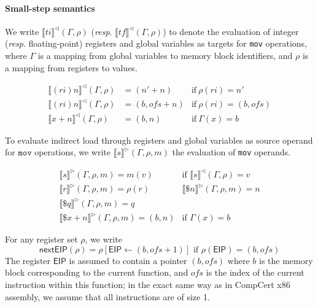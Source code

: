 \paragraph{Small-step semantics}

We write $\llbracket \mathit{ti} \rrbracket^\triangleleft(\Gamma, \rho)$
(\emph{resp}. $\llbracket \mathit{tf} \rrbracket^\triangleleft(\Gamma, \rho)$)
to denote the evaluation of integer (\emph{resp}. floating-point) registers
and global variables as targets for \texttt{mov} operations, where
$\Gamma$ is a mapping from global variables to memory block
identifiers, and $\rho$ is a mapping from registers to values.

\[
\begin{array}{lll}
\llbracket (\mathit{ri})n \rrbracket^\triangleleft(\Gamma, \rho) & = (n' + n) & \text{if} ~ \rho(\mathit{ri}) = n' \\
\llbracket (\mathit{ri})n \rrbracket^\triangleleft(\Gamma, \rho) & = (b, \mathit{ofs}+n) & \text{if} ~ \rho(\mathit{ri}) = (b, \mathit{ofs}) \\
\llbracket x + n  \rrbracket^\triangleleft(\Gamma, \rho) & = (b, n) & \text{if} ~ \Gamma(x) = b
\end{array}
\]

To evaluate indirect load through registers and global variables as
source operand for $\mathtt{mov}$ operations, we write $\llbracket s
\rrbracket^\triangleright(\Gamma, \rho, m)$ the evaluation of
\texttt{mov} operands.

\[
\begin{array}{ll}
\llbracket s \rrbracket^\triangleright(\Gamma, \rho, m)  = m(v) &
\text{if }  \llbracket s \rrbracket^\triangleleft(\Gamma, \rho) = v 
\\
\llbracket r \rrbracket^\triangleright(\Gamma, \rho, m)= \rho(r) &
\llbracket \$ n \rrbracket^\triangleright(\Gamma, \rho, m)  = n 
\\
\llbracket \$ q \rrbracket^\triangleright(\Gamma, \rho, m)  = q 
\\
\llbracket \$ x+n \rrbracket^\triangleright(\Gamma, \rho, m)  = (b, n)  &
\text{if }  \Gamma(x)  = b 
\end{array}
\]

For any register set $\rho$, we write 
\[\mathsf{nextEIP}(\rho) =
\rho[\mathsf{EIP} \leftarrow (b, \mathit{ofs}+1)] \text{ if }\rho(\mathsf{EIP})
  = (b, \mathit{ofs})\]%
The register $\mathsf{EIP}$ is assumed to contain a
  pointer $(b, \mathit{ofs})$ where $b$ is the memory block
  corresponding to the current function, and $\mathit{ofs}$ is the
  index of the current instruction within this function; in the exact
  same way as in CompCert x86 assembly, we assume that all
  instructions are of size 1.

